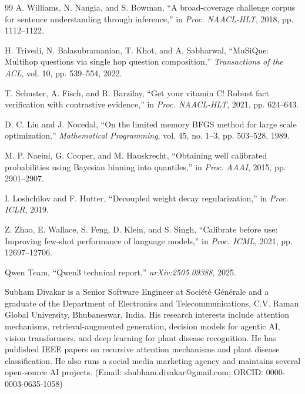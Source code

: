 \documentclass[twocolumn]{ICCKjournal}
\begin{document}
\begin{fullwidth}
\begin{thebibliography}{99}
A. Williams, N. Nangia, and S. Bowman, ``A broad-coverage challenge corpus for sentence understanding through inference,'' in \textit{Proc. NAACL-HLT}, 2018, pp. 1112--1122.

H. Trivedi, N. Balasubramanian, T. Khot, and A. Sabharwal, ``MuSiQue: Multihop questions via single hop question composition,'' \textit{Transactions of the ACL}, vol. 10, pp. 539--554, 2022.

T. Schuster, A. Fisch, and R. Barzilay, ``Get your vitamin C! Robust fact verification with contrastive evidence,'' in \textit{Proc. NAACL-HLT}, 2021, pp. 624--643.

D. C. Liu and J. Nocedal, ``On the limited memory BFGS method for large scale optimization,'' \textit{Mathematical Programming}, vol. 45, no. 1--3, pp. 503--528, 1989.

M. P. Naeini, G. Cooper, and M. Hauskrecht, ``Obtaining well calibrated probabilities using Bayesian binning into quantiles,'' in \textit{Proc. AAAI}, 2015, pp. 2901--2907.

I. Loshchilov and F. Hutter, ``Decoupled weight decay regularization,'' in \textit{Proc. ICLR}, 2019.

Z. Zhao, E. Wallace, S. Feng, D. Klein, and S. Singh, ``Calibrate before use: Improving few-shot performance of language models,'' in \textit{Proc. ICML}, 2021, pp. 12697--12706.

Qwen Team, ``Qwen3 technical report,'' \textit{arXiv:2505.09388}, 2025.

\end{thebibliography}
\end{fullwidth}


\makeatletter
\if@twocolumn

  \begin{biography}[author1]{Subham Divakar} is a Senior Software Engineer at Soci\'{e}t\'{e} G\'{e}n\'{e}rale and a graduate of the Department of Electronics and Telecommunications, C.V. Raman Global University, Bhubaneswar, India. His research interests include attention mechanisms, retrieval-augmented generation, decision models for agentic AI, vision transformers, and deep learning for plant disease recognition. He has published IEEE papers on recursive attention mechanisms and plant disease classification. He also runs a social media marketing agency and maintains several open-source AI projects. (Email: shubham.divakar@gmail.com; ORCID: 0000-0003-0635-1058)
  \end{biography}
\end{document}
